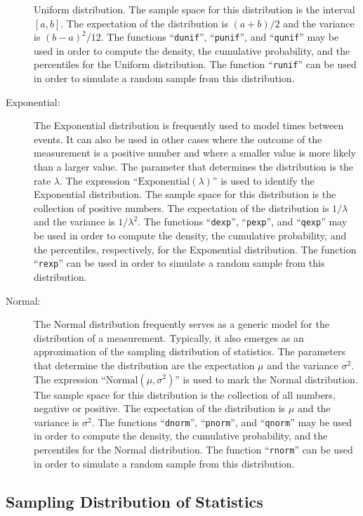 \documentclass[]{krantz}
\theoremstyle{definition}
\theoremstyle{definition}
\theoremstyle{definition}
\theoremstyle{remark}
\begin{document}
\begin{description}
Uniform distribution. The sample space for this distribution is the
interval \([a,b]\). The expectation of the distribution is \((a+b)/2\)
and the variance is \((b-a)^2/12\). The functions ``\texttt{dunif}'',
``\texttt{punif}'', and ``\texttt{qunif}'' may be used in order to compute the
density, the cumulative probability, and the percentiles for the
Uniform distribution. The function ``\texttt{runif}'' can be used in order to
simulate a random sample from this distribution.
\item[Exponential:]
The Exponential distribution is frequently used to model times
between events. It can also be used in other cases where the outcome
of the measurement is a positive number and where a smaller value is
more likely than a larger value. The parameter that determines the
distribution is the rate \(\lambda\). The expression
``\(\mathrm{Exponential}(\lambda)\)'' is used to identify the
Exponential distribution. The sample space for this distribution is
the collection of positive numbers. The expectation of the
distribution is \(1/\lambda\) and the variance is \(1/\lambda^2\). The
functions ``\texttt{dexp}'', ``\texttt{pexp}'', and ``\texttt{qexp}'' may be used in order to
compute the density, the cumulative probability, and the
percentiles, respectively, for the Exponential distribution. The
function ``\texttt{rexp}'' can be used in order to simulate a random sample
from this distribution.
\item[Normal:]
The Normal distribution frequently serves as a generic model for the
distribution of a measurement. Typically, it also emerges as an
approximation of the sampling distribution of statistics. The
parameters that determine the distribution are the expectation \(\mu\)
and the variance \(\sigma^2\). The expression
``\(\mathrm{Normal}(\mu,\sigma^2)\)'' is used to mark the Normal
distribution. The sample space for this distribution is the
collection of all numbers, negative or positive. The expectation of
the distribution is \(\mu\) and the variance is \(\sigma^2\). The
functions ``\texttt{dnorm}'', ``\texttt{pnorm}'', and ``\texttt{qnorm}'' may be used in order
to compute the density, the cumulative probability, and the
percentiles for the Normal distribution. The function ``\texttt{rnorm}'' can
be used in order to simulate a random sample from this distribution.
\end{description}

\hypertarget{sampling-distribution-of-statistics}{%
\subsection{Sampling Distribution of Statistics}\label{sampling-distribution-of-statistics}}
\end{document}
